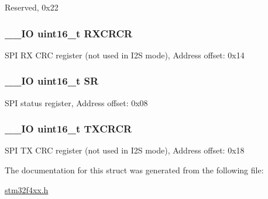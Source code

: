 Reserved, 0x22 \hypertarget{struct_s_p_i___type_def_a7ad53aa3735ccdd785e3eec02faf5eb9}{
\subsubsection[{R\-X\-C\-R\-C\-R}]{\setlength{\rightskip}{0pt plus 5cm}\-\_\-\-\_\-\-I\-O uint16\-\_\-t R\-X\-C\-R\-C\-R}}\label{struct_s_p_i___type_def_a7ad53aa3735ccdd785e3eec02faf5eb9}
S\-P\-I R\-X C\-R\-C register (not used in I2\-S mode), Address offset\-: 0x14 \hypertarget{struct_s_p_i___type_def_a44962ea5442d203bf4954035d1bfeb9d}{
\subsubsection[{S\-R}]{\setlength{\rightskip}{0pt plus 5cm}\-\_\-\-\_\-\-I\-O uint16\-\_\-t S\-R}}\label{struct_s_p_i___type_def_a44962ea5442d203bf4954035d1bfeb9d}
S\-P\-I status register, Address offset\-: 0x08 \hypertarget{struct_s_p_i___type_def_a0238d40f977d03709c97033b8379f98f}{
\subsubsection[{T\-X\-C\-R\-C\-R}]{\setlength{\rightskip}{0pt plus 5cm}\-\_\-\-\_\-\-I\-O uint16\-\_\-t T\-X\-C\-R\-C\-R}}\label{struct_s_p_i___type_def_a0238d40f977d03709c97033b8379f98f}
S\-P\-I T\-X C\-R\-C register (not used in I2\-S mode), Address offset\-: 0x18 

The documentation for this struct was generated from the following file\-:\begin{DoxyCompactItemize}
\item 
\hyperlink{stm32f4xx_8h}{stm32f4xx.\-h}\end{DoxyCompactItemize}
